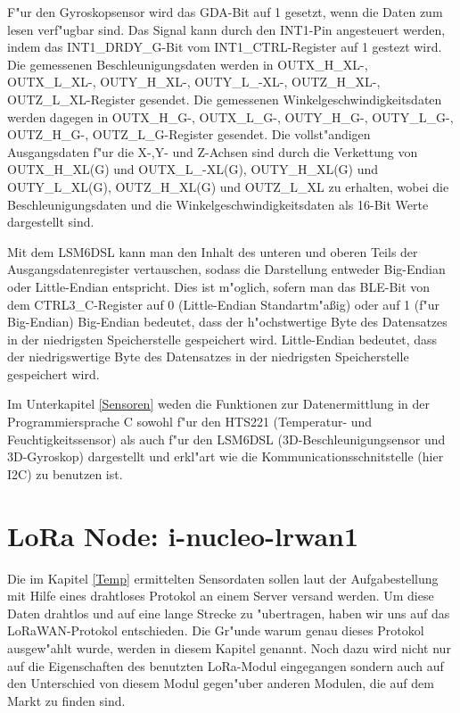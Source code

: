 F"ur den Gyroskopsensor wird das GDA-Bit auf 1 gesetzt, wenn die Daten zum lesen verf"ugbar sind. Das Signal kann durch den INT1-Pin angesteuert werden, indem  das INT1\_DRDY\_G-Bit vom INT1\_CTRL-Register auf 1 gestezt wird. Die gemessenen Beschleunigungsdaten werden in OUTX\_H\_XL-, OUTX\_L\_XL-, OUTY\_H\_XL-, OUTY\_L\_-XL-, OUTZ\_H\_XL-, OUTZ\_L\_XL-Register gesendet. Die gemessenen Winkelgeschwindigkeitsdaten werden dagegen in OUTX\_H\_G-, OUTX\_L\_G-, OUTY\_H\_G-, OUTY\_L\_G-, OUTZ\_H\_G-, OUTZ\_L\_G-Register gesendet. Die vollst"andigen Ausgangsdaten f"ur die X-,Y- und Z-Achsen sind durch die Verkettung von OUTX\_H\_XL(G) und OUTX\_L\_-XL(G), OUTY\_H\_XL(G) und OUTY\_L\_XL(G), OUTZ\_H\_XL(G) und OUTZ\_L\_XL zu erhalten, wobei die Beschleunigungsdaten und die Winkelgeschwindigkeitsdaten als 16-Bit Werte dargestellt sind.

Mit dem LSM6DSL kann man den Inhalt des unteren und oberen Teils der Ausgangsdatenregister vertauschen, sodass die Darstellung entweder Big-Endian oder Little-Endian entspricht. Dies ist m"oglich, sofern man das BLE-Bit von dem CTRL3\_C-Register auf 0 (Little-Endian Standartm"a\ss{}ig) oder auf 1 (f"ur Big-Endian) 
Big-Endian bedeutet, dass der h"ochstwertige Byte des Datensatzes in der niedrigsten Speicherstelle gespeichert wird.
Little-Endian bedeutet, dass der niedrigswertige Byte des Datensatzes in der niedrigsten Speicherstelle gespeichert wird.


Im Unterkapitel \ref{Sensoren} weden die Funktionen zur Datenermittlung in der Programmiersprache C sowohl f"ur den HTS221 (Temperatur- und Feuchtigkeitssensor) als auch f"ur den LSM6DSL (3D-Beschleunigungsensor und 3D-Gyroskop) dargestellt und erkl"art wie die Kommunicationsschnitstelle (hier I2C) zu benutzen ist.


\vspace{5cm}
\section{LoRa Node: i-nucleo-lrwan1}\label{LoRa Modul}

Die im Kapitel \ref{Temp} ermittelten Sensordaten sollen laut der Aufgabestellung mit Hilfe eines drahtloses Protokol an einem Server versand werden. Um diese Daten drahtlos und auf eine lange Strecke zu "ubertragen, haben wir uns auf das LoRaWAN-Protokol entschieden. Die Gr"unde warum genau dieses Protokol ausgew"ahlt wurde, werden in diesem Kapitel genannt. Noch dazu wird nicht nur auf die Eigenschaften des benutzten LoRa-Modul eingegangen sondern auch auf den Unterschied von diesem Modul gegen"uber anderen Modulen, die auf dem Markt zu finden sind.   
 
